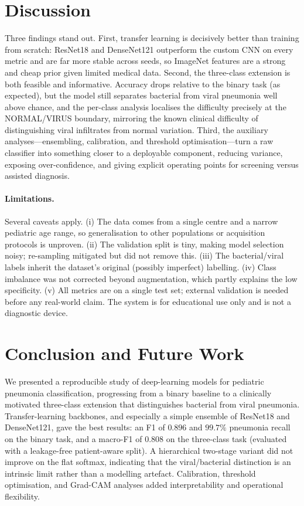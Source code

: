 \documentclass[runningheads]{llncs}
\begin{document}
\section{Discussion}

Three findings stand out. First, transfer learning is decisively better
than training from scratch: ResNet18 and DenseNet121 outperform the custom
CNN on every metric and are far more stable across seeds, so ImageNet
features are a strong and cheap prior given limited medical data. Second, the
three-class extension is both feasible and informative. Accuracy drops
relative to the binary task (as expected), but the model still separates
bacterial from viral pneumonia well above chance, and the per-class analysis
localises the difficulty precisely at the NORMAL/VIRUS boundary, mirroring
the known clinical difficulty of distinguishing viral infiltrates from normal
variation. Third, the auxiliary analyses---ensembling, calibration, and
threshold optimisation---turn a raw classifier into something closer to a
deployable component, reducing variance, exposing over-confidence, and giving
explicit operating points for screening versus assisted diagnosis.

\paragraph{Limitations.}
Several caveats apply. (i) The data comes from a single centre and a narrow
pediatric age range, so generalisation to other populations or acquisition
protocols is unproven. (ii) The validation split is tiny, making model
selection noisy; re-sampling mitigated but did not remove this. (iii) The
bacterial/viral labels inherit the dataset's original (possibly imperfect)
labelling. (iv) Class imbalance was not corrected beyond augmentation, which
partly explains the low specificity. (v) All metrics are on a single test
set; external validation is needed before any real-world claim. The system
is for educational use only and is not a diagnostic device.

\section{Conclusion and Future Work}

We presented a reproducible study of deep-learning models for pediatric
pneumonia classification, progressing from a binary baseline to a
clinically motivated three-class extension that distinguishes bacterial
from viral pneumonia. Transfer-learning backbones, and especially a simple
ensemble of ResNet18 and DenseNet121, gave the best results: an F1 of
$0.896$ and $99.7\%$ pneumonia recall on the binary task, and a macro-F1 of
$0.808$ on the three-class task (evaluated with a leakage-free patient-aware
split). A hierarchical two-stage variant did not improve on the flat
softmax, indicating that the viral/bacterial distinction is an intrinsic
limit rather than a modelling artefact. Calibration, threshold optimisation,
and Grad-CAM analyses added interpretability and operational flexibility.
\end{document}
